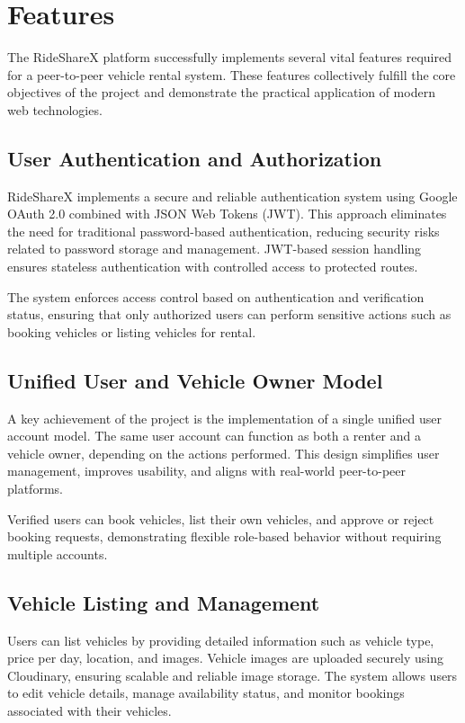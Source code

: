 \documentclass[12pt,a4paper]{report}
\begin{document}
\section{Features}

The RideShareX platform successfully implements several vital features required for a peer-to-peer vehicle rental system. These features collectively fulfill the core objectives of the project and demonstrate the practical application of modern web technologies.

\subsection{User Authentication and Authorization}

RideShareX implements a secure and reliable authentication system using Google OAuth 2.0\cite{oauth} combined with JSON Web Tokens (JWT)\cite{jwt}. This approach eliminates the need for traditional password-based authentication, reducing security risks related to password storage and management. JWT-based session handling ensures stateless authentication with controlled access to protected routes.

The system enforces access control based on authentication and verification status, ensuring that only authorized users can perform sensitive actions such as booking vehicles or listing vehicles for rental.

\subsection{Unified User and Vehicle Owner Model}

A key achievement of the project is the implementation of a single unified user account model. The same user account can function as both a renter and a vehicle owner, depending on the actions performed. This design simplifies user management, improves usability, and aligns with real-world peer-to-peer platforms.

Verified users can book vehicles, list their own vehicles, and approve or reject booking requests, demonstrating flexible role-based behavior without requiring multiple accounts.

\subsection{Vehicle Listing and Management}

Users can list vehicles by providing detailed information such as vehicle type, price per day, location, and images. Vehicle images are uploaded securely using Cloudinary\cite{cloudinary}, ensuring scalable and reliable image storage. The system allows users to edit vehicle details, manage availability status, and monitor bookings associated with their vehicles.
\end{document}
